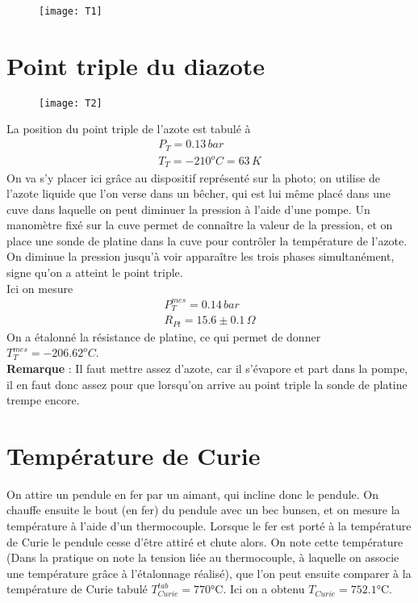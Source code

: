 \documentclass[12pt,prb,aps,epsf]{article}
\begin{document}
\begin{figure}
	\centerline{\texttt{[image: T1]}}
\end{figure}

\section{Point triple du diazote}
\begin{figure}
	\centerline{\texttt{[image: T2]}}
\end{figure}

La position du point triple de l'azote est tabulé à 
\begin{eqnarray}
P_T = 0.13\,bar\\
T_T = -210^oC = 63\,K
\end{eqnarray}
On va s'y placer ici grâce au dispositif représenté sur la photo; on utilise de l'azote liquide que l'on verse dans un bêcher, qui est lui même placé dans une cuve dans laquelle on peut diminuer la pression à l'aide d'une pompe. Un manomètre fixé sur la cuve permet de connaître la valeur de la pression, et on place une sonde de platine dans la cuve pour contrôler la température de l'azote. On diminue la pression jusqu'à voir apparaître les trois phases simultanément, signe qu'on a atteint le point triple.\\

Ici on mesure 
\begin{eqnarray}
P_T^{mes} = 0.14\, bar\\
R_{Pt} = 15.6\pm 0.1\, \Omega
\end{eqnarray}
On a étalonné la résistance de platine, ce qui permet de donner $T_T^{mes} = -206.62^oC$.\\

\textbf{Remarque} : Il faut mettre assez d'azote, car il s'évapore et part dans la pompe, il en faut donc assez pour que lorsqu'on arrive au point triple la sonde de platine trempe encore.

\section{Température de Curie}	
On attire un pendule en fer par un aimant, qui incline donc le pendule. On chauffe ensuite le bout (en fer) du pendule avec un bec bunsen, et on mesure la température à l'aide d'un thermocouple. Lorsque le fer est porté à la température de Curie le pendule cesse d'être attiré et chute alors. On note cette température (Dans la pratique on note la tension liée au thermocouple, à laquelle on associe une température grâce à l'étalonnage réalisé), que l'on peut ensuite comparer à la température de Curie tabulé $T_{Curie}^{tab} = 770$°C. Ici on a obtenu $T_{Curie} = 752.1$°C.
\end{document}
